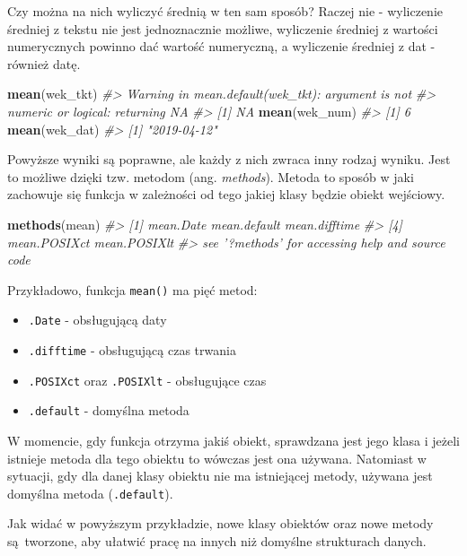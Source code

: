 \documentclass[paper=6in:9in,pagesize=pdftex,headinclude=on,footinclude=on,10pt]{scrbook}
\newenvironment{Shaded}{\begin{snugshade}}{\end{snugshade}}
\newcommand{\CommentTok}[1]{\textcolor[rgb]{0.56,0.35,0.01}{\textit{#1}}}
\newcommand{\KeywordTok}[1]{\textcolor[rgb]{0.13,0.29,0.53}{\textbf{#1}}}
\newcommand{\NormalTok}[1]{#1}
\providecommand{\tightlist}{%
  \setlength{\itemsep}{0pt}\setlength{\parskip}{0pt}}
\begin{document}
Czy można na nich wyliczyć średnią w ten sam sposób?
Raczej nie - wyliczenie średniej z tekstu nie jest jednoznacznie możliwe, wyliczenie średniej z wartości numerycznych powinno dać wartość numeryczną, a wyliczenie średniej z dat - również datę.

\begin{Shaded}
\begin{Highlighting}[]
\KeywordTok{mean}\NormalTok{(wek_tkt)}
\CommentTok{#> Warning in mean.default(wek_tkt): argument is not}
\CommentTok{#> numeric or logical: returning NA}
\CommentTok{#> [1] NA}
\KeywordTok{mean}\NormalTok{(wek_num)}
\CommentTok{#> [1] 6}
\KeywordTok{mean}\NormalTok{(wek_dat)}
\CommentTok{#> [1] "2019-04-12"}
\end{Highlighting}
\end{Shaded}

Powyższe wyniki są poprawne, ale każdy z nich zwraca inny rodzaj wyniku.
Jest to możliwe dzięki tzw. metodom (ang. \emph{methods}).
Metoda to sposób w jaki zachowuje się funkcja w zależności od tego jakiej klasy będzie obiekt wejściowy.

\begin{Shaded}
\begin{Highlighting}[]
\KeywordTok{methods}\NormalTok{(mean)}
\CommentTok{#> [1] mean.Date     mean.default  mean.difftime}
\CommentTok{#> [4] mean.POSIXct  mean.POSIXlt }
\CommentTok{#> see '?methods' for accessing help and source code}
\end{Highlighting}
\end{Shaded}

Przykładowo, funkcja \texttt{mean()} ma pięć metod:

\begin{itemize}
\tightlist
\item
  \texttt{.Date} - obsługującą daty
\item
  \texttt{.difftime} - obsługującą czas trwania
\item
  \texttt{.POSIXct} oraz \texttt{.POSIXlt} - obsługujące czas
\item
  \texttt{.default} - domyślna metoda
\end{itemize}

W momencie, gdy funkcja otrzyma jakiś obiekt, sprawdzana jest jego klasa i jeżeli istnieje metoda dla tego obiektu to wówczas jest ona używana.
Natomiast w sytuacji, gdy dla danej klasy obiektu nie ma istniejącej metody, używana jest domyślna metoda (\texttt{.default}).

Jak widać w powyższym przykładzie, nowe klasy obiektów oraz nowe metody są~tworzone, aby ułatwić pracę na innych niż domyślne strukturach danych.
\end{document}
